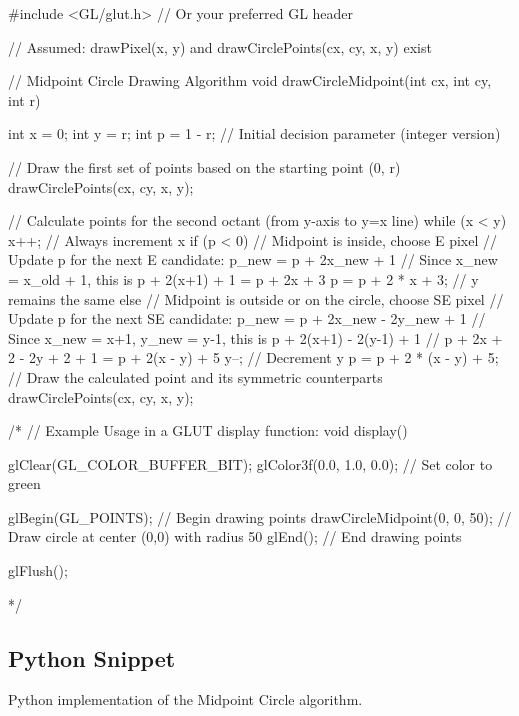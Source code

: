 \documentclass[12pt, a4paper]{article}
\begin{document}
\begin{cppcode}
#include <GL/glut.h> // Or your preferred GL header

// Assumed: drawPixel(x, y) and drawCirclePoints(cx, cy, x, y) exist

// Midpoint Circle Drawing Algorithm
void drawCircleMidpoint(int cx, int cy, int r) {
    int x = 0;
    int y = r;
    int p = 1 - r; // Initial decision parameter (integer version)

    // Draw the first set of points based on the starting point (0, r)
    drawCirclePoints(cx, cy, x, y);

    // Calculate points for the second octant (from y-axis to y=x line)
    while (x < y) {
        x++; // Always increment x
        if (p < 0) {
            // Midpoint is inside, choose E pixel
            // Update p for the next E candidate: p_new = p + 2x_new + 1
            // Since x_new = x_old + 1, this is p + 2(x+1) + 1 = p + 2x + 3
            p = p + 2 * x + 3;
            // y remains the same
        } else {
            // Midpoint is outside or on the circle, choose SE pixel
            // Update p for the next SE candidate: p_new = p + 2x_new - 2y_new + 1
            // Since x_new = x+1, y_new = y-1, this is p + 2(x+1) - 2(y-1) + 1
            // p + 2x + 2 - 2y + 2 + 1 = p + 2(x - y) + 5
            y--; // Decrement y
            p = p + 2 * (x - y) + 5;
        }
        // Draw the calculated point and its symmetric counterparts
        drawCirclePoints(cx, cy, x, y);
    }
}

/*
// Example Usage in a GLUT display function:
void display() {
    glClear(GL_COLOR_BUFFER_BIT);
    glColor3f(0.0, 1.0, 0.0); // Set color to green

    glBegin(GL_POINTS); // Begin drawing points
    drawCircleMidpoint(0, 0, 50); // Draw circle at center (0,0) with radius 50
    glEnd(); // End drawing points

    glFlush();
}
*/
\end{cppcode}

\subsection{Python Snippet}
Python implementation of the Midpoint Circle algorithm.
\end{document}
